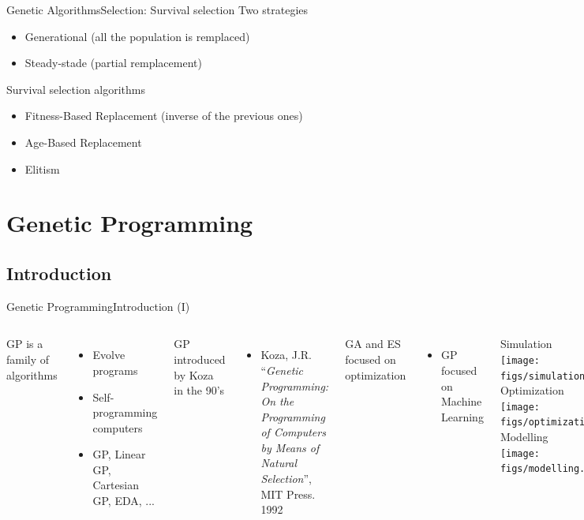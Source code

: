 \documentclass[10pt,compress]{beamer} %
\begin{document}
\begin{frame}{Genetic Algorithms}{Selection: Survival selection}
	Two strategies
	\begin{itemize}
		\item Generational (all the population is remplaced)
		\item Steady-stade (partial remplacement)
	\end{itemize}
	Survival selection algorithms
	\begin{itemize}
		\item Fitness-Based Replacement (inverse of the previous ones)
		\item Age-Based Replacement
		\item Elitism
  	\end{itemize}
\end{frame}

\section{Genetic Programming}
\subsection{Introduction}
\begin{frame}{Genetic Programming}{Introduction (I)}
    \begin{columns}
	GP is a family of algorithms
	\begin{itemize}
		\item Evolve programs
		\item Self-programming computers
		\item GP, Linear GP, Cartesian GP, EDA, ...
	\end{itemize}

	GP introduced by Koza in the 90's
	\begin{itemize}
		\item[] \small{Koza, J.R.  ``\textit{Genetic Programming: On the Programming of Computers by Means of Natural Selection}'', MIT Press. 1992}
	\end{itemize}

	GA and ES focused on optimization
	\begin{itemize}
		\item GP focused on Machine Learning
	\end{itemize}
	   \begin{center}
		Simulation\\
	\texttt{[image: figs/simulation.eps]}\\\bigskip
	   Optimization\\
	\texttt{[image: figs/optimization.eps]}\\\bigskip
		Modelling\\
	\texttt{[image: figs/modelling.eps]}\\
	\end{center}
	   \end{columns}
\end{frame}
\end{document}
